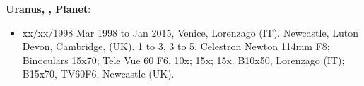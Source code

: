 {\bf Uranus, , Planet}:
\begin{itemize}
\item xx/xx/1998 Mar 1998 to Jan 2015, Venice, Lorenzago (IT). Newcastle, Luton Devon, Cambridge, (UK). 1 to 3, 3 to 5. Celestron Newton 114mm F8; Binoculars 15x70; Tele Vue 60 F6, 10x; 15x; 15x. B10x50, Lorenzago (IT); B15x70, TV60F6, Newcastle (UK).
\end{itemize}
